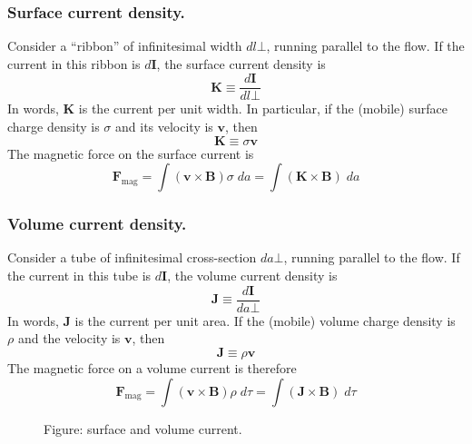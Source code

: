 \documentclass[../../../main.tex]{subfiles}
\begin{document}
\subsubsection*{Surface current density.} Consider a “ribbon” of inﬁnitesimal width $dl\bot$, running parallel to the ﬂow. If the current in this ribbon is $d\mathbf{I}$, the surface current density is
\begin{equation*}
    \mathbf{K}\equiv\frac{d\mathbf{I}}{dl\bot}
\end{equation*}
In words, $\mathbf{K}$ is the current per unit width. In particular, if the (mobile) surface charge density is $\sigma$ and its velocity is $\mathbf{v}$, then
\begin{equation*}
    \mathbf{K}\equiv\sigma\mathbf{v}
\end{equation*}
The magnetic force on the surface current is
\begin{equation*}
    \mathbf{F}_{\text{mag}}=\int (\mathbf{v}\times\mathbf{B})\sigma\;da= \int (\mathbf{K}\times\mathbf{B})\;da
\end{equation*}

\subsubsection*{Volume current density.} Consider a tube of inﬁnitesimal cross-section $da\bot$, running parallel to the ﬂow. If the current in this tube is $d\mathbf{I}$, the volume current density is
\begin{equation*}
    \mathbf{J}\equiv\frac{d\mathbf{I}}{da\bot}
\end{equation*}
In words, $\mathbf{J}$ is the current per unit area. If the (mobile) volume charge density is $\rho$ and the velocity is $\mathbf{v}$, then
\begin{equation*}
    \mathbf{J}\equiv\rho\mathbf{v}
\end{equation*}
The magnetic force on a volume current is therefore
\begin{equation*}
    \mathbf{F}_{\text{mag}}=\int (\mathbf{v}\times\mathbf{B})\rho\;d\tau= \int (\mathbf{J}\times\mathbf{B})\;d\tau
\end{equation*}

\begin{figure*}
    \centering
    \caption*{Figure: surface and volume current.}
\end{figure*}
\end{document}
